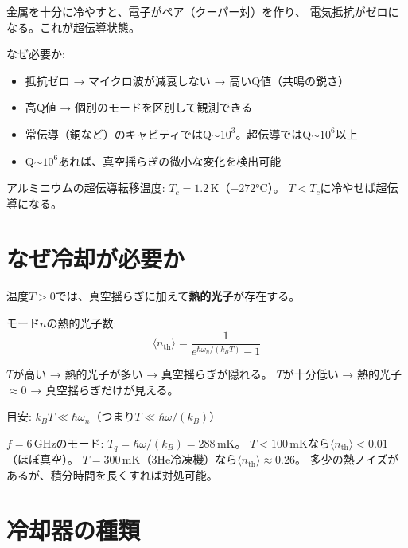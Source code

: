 \documentclass[12pt,a4paper]{article}
\begin{document}
\begin{theorybox}[超伝導とは]
金属を十分に冷やすと、電子がペア（クーパー対）を作り、
電気抵抗がゼロになる。これが超伝導状態。

なぜ必要か:
\begin{itemize}
\item 抵抗ゼロ → マイクロ波が減衰しない → 高いQ値（共鳴の鋭さ）
\item 高Q値 → 個別のモードを区別して観測できる
\item 常伝導（銅など）のキャビティではQ$\sim 10^3$。超伝導ではQ$\sim 10^6$以上
\item Q$\sim 10^6$あれば、真空揺らぎの微小な変化を検出可能
\end{itemize}

アルミニウムの超伝導転移温度: $T_c = 1.2\,\mathrm{K}$（$-272$°C）。
$T < T_c$に冷やせば超伝導になる。
\end{theorybox}

\section{なぜ冷却が必要か}

\begin{theorybox}
温度$T > 0$では、真空揺らぎに加えて\textbf{熱的光子}が存在する。

モード$n$の熱的光子数:
$$\langle n_{\mathrm{th}}\rangle = \frac{1}{e^{\hbar\omega_n/(k_BT)} - 1}$$

$T$が高い → 熱的光子が多い → 真空揺らぎが隠れる。
$T$が十分低い → 熱的光子$\approx 0$ → 真空揺らぎだけが見える。

目安: $k_BT \ll \hbar\omega_n$（つまり$T \ll \hbar\omega/(k_B)$）

$f = 6\,\mathrm{GHz}$のモード: $T_q = \hbar\omega/(k_B) = 288\,\mathrm{mK}$。
$T < 100\,\mathrm{mK}$なら$\langle n_{\mathrm{th}}\rangle < 0.01$（ほぼ真空）。
$T = 300\,\mathrm{mK}$（3He冷凍機）なら$\langle n_{\mathrm{th}}\rangle \approx 0.26$。
多少の熱ノイズがあるが、積分時間を長くすれば対処可能。
\end{theorybox}

\section{冷却器の種類}
\end{document}

